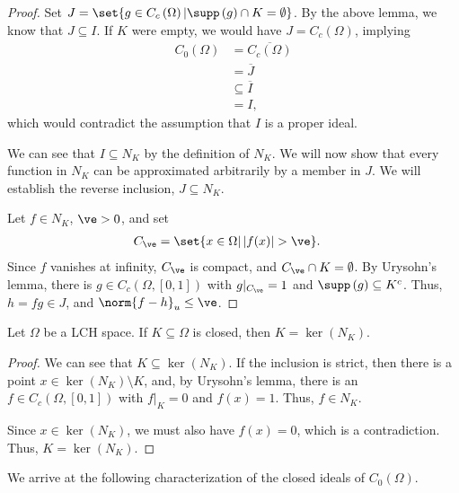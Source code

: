 \documentclass[10pt]{mypackage}
\begin{document}
\begin{proof}
  Set $J = \set{g\in C_c\left(\Omega\right) | \supp\left(g\right)\cap K = \emptyset}$. By the above lemma, we know that $J\subseteq I$. If $K$ were empty, we would have $J = C_c\left(\Omega\right)$, implying
  \begin{align*}
    C_0\left(\Omega\right) &= \overline{C_c\left(\Omega\right)}\\
                           &= \overline{J}\\
                           &\subseteq \overline{I}\\
                           &= I,
  \end{align*}
  which would contradict the assumption that $I$ is a proper ideal.\newline

  We can see that $I\subseteq N_K$ by the definition of $N_K$. We will now show that every function in $N_K$ can be approximated arbitrarily by a member in $J$. We will establish the reverse inclusion, $J\subseteq N_K$.\newline

  Let $f\in N_K$, $\ve > 0$, and set
  \begin{align*}
    C_{\ve} &= \set{x\in \Omega | \left\vert f(x) \right\vert > \ve}.
  \end{align*}
  Since $f$ vanishes at infinity, $C_{\ve}$ is compact, and $C_{\ve}\cap K = \emptyset$. By Urysohn's lemma, there is $g\in C_c\left(\Omega,[0,1]\right)$ with $g|_{C_{\ve}} = 1$ and $\supp\left(g\right)\subseteq K^{c}$. Thus, $h = fg\in J$, and $\norm{f-h}_{u} \leq \ve$.
\end{proof}
\begin{proposition}
  Let $\Omega$ be a LCH space. If $K\subseteq \Omega$ is closed, then $K = \ker\left(N_K\right)$.
\end{proposition}
\begin{proof}
  We can see that $K\subseteq \ker\left(N_K\right)$. If the inclusion is strict, then there is a point $x\in \ker\left(N_K\right)\setminus K$, and, by Urysohn's lemma, there is an $f\in C_c\left(\Omega,[0,1]\right)$ with $f|_{K} = 0$ and $f\left(x\right) = 1$. Thus, $f\in N_K$.\newline

  Since $x\in \ker\left(N_K\right)$, we must also have $f\left(x\right) = 0$, which is a contradiction. Thus, $K = \ker\left(N_K\right)$.
\end{proof}
We arrive at the following characterization of the closed ideals of $C_0\left(\Omega\right)$.
\end{document}
